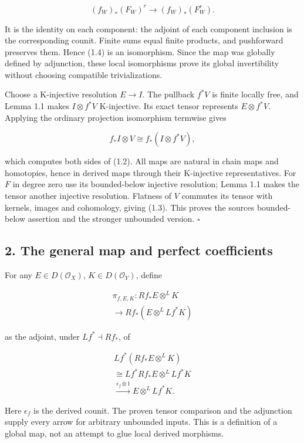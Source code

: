 \documentclass[
  english,
  11pt,
  a4paper,
]{article}
\begin{document}
\[(f_W)_*(F_W)^r\longrightarrow(f_W)_*(F_W^r).
\tag{1.4}\]

It is the identity on each component: the adjoint of each component
inclusion is the corresponding counit. Finite sums equal finite
products, and pushforward preserves them. Hence (1.4) is an isomorphism.
Since the map was globally defined by adjunction, these local
isomorphisms prove its global invertibility without choosing compatible
trivializations.

Choose a K-injective resolution \(E\to I\). The pullback \(f^*V\) is
finite locally free, and Lemma 1.1 makes \(I\otimes f^*V\) K-injective.
Its exact tensor represents \(E\otimes f^*V\). Applying the ordinary
projection isomorphism termwise gives

\[f_*I\otimes V\cong f_*(I\otimes f^*V),
\tag{1.5}\]

which computes both sides of (1.2). All maps are natural in chain maps
and homotopies, hence in derived maps through their K-injective
representatives. For \(F\) in degree zero use its bounded-below
injective resolution; Lemma 1.1 makes the tensor another injective
resolution. Flatness of \(V\) commutes its tensor with kernels, images
and cohomology, giving (1.3). This proves the source\textquotesingle s
bounded-below assertion and the stronger unbounded version. \(\square\)

\subsection{2. The general map and perfect
coefficients}\label{projection-formula-and-base-change--2-the-general-map-and-perfect-coefficients}

For any \(E\in D(\mathcal O_X)\), \(K\in D(\mathcal O_Y)\), define

\[\begin{gathered}
\pi_{f,E,K}:Rf_*E\otimes^L K\\
\longrightarrow Rf_*(E\otimes^L Lf^*K)
\end{gathered}
\tag{2.1}\]

as the adjoint, under \(Lf^*\dashv Rf_*\), of

\[\begin{gathered}
Lf^*(Rf_*E\otimes^L K)\\
\cong Lf^*Rf_*E\otimes^L Lf^*K\\
\xrightarrow{\epsilon_f\otimes1}E\otimes^L Lf^*K.
\end{gathered}
\tag{2.2}\]

Here \(\epsilon_f\) is the derived counit. The proven tensor comparison
and the adjunction supply every arrow for arbitrary unbounded inputs.
This is a definition of a global map, not an attempt to glue local
derived morphisms.
\end{document}
